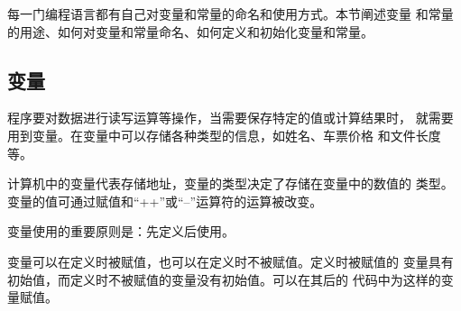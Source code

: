 ﻿%
%

每一门编程语言都有自己对变量和常量的命名和使用方式。本节阐述变量
和常量的用途、如何对变量和常量命名、如何定义和初始化变量和常量。

\subsection{变量}

程序要对数据进行读写运算等操作，当需要保存特定的值或计算结果时，
就需要用到变量。在变量中可以存储各种类型的信息，如姓名、车票价格
和文件长度等。

计算机中的变量代表存储地址，变量的类型决定了存储在变量中的数值的
类型。变量的值可通过赋值和“++”或“--”运算符的运算被改变。

变量使用的重要原则是：先定义后使用。

变量可以在定义时被赋值，也可以在定义时不被赋值。定义时被赋值的
变量具有初始值，而定义时不被赋值的变量没有初始值。可以在其后的
代码中为这样的变量赋值。
